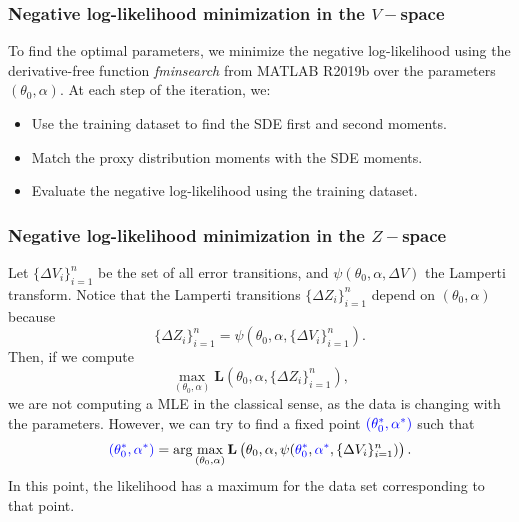 \documentclass[11pt]{article}
\theoremstyle{definition}
\begin{document}
\subsubsection{Negative log-likelihood minimization in the $V-$space} \label{Sec:MinLH}

To find the optimal parameters, we minimize the negative log-likelihood using the derivative-free function \textit{fminsearch} from MATLAB R2019b over the parameters $(\theta_0,\alpha)$. At each step of the iteration,  we:
\begin{itemize}

\item Use the training dataset to find the SDE first and second moments.
\item Match the proxy distribution moments with the SDE moments.
\item Evaluate the negative log-likelihood using the training dataset.

\end{itemize}

\subsubsection{Negative log-likelihood minimization in the $Z-$space} \label{Sec:MinLHL}

Let $\{\Delta V_i\}_{i=1}^n$ be the set of all error transitions, and $\psi(\theta_0,\alpha,\Delta V)$ the Lamperti transform. Notice that the Lamperti transitions $\{\Delta Z_i\}_{i=1}^n$ depend on $(\theta_0,\alpha)$ because $$\{\Delta Z_i\}_{i=1}^n=\psi(\theta_0,\alpha,\{\Delta V_i\}_{i=1}^n).$$
Then, if we compute $$\max_{(\theta_0,\alpha)}\mathbf{L}(\theta_0,\alpha,\{\Delta Z_i\}_{i=1}^n),$$
we are not computing a MLE in the classical sense, as the data is changing with the parameters. However, we can try to find a fixed point ${\color{blue}(\theta_0^*,\alpha^*)}$ such that
\begin{equation}
{\color{blue}(\theta_0^*,\alpha^*)}=\arg\max_{(\theta_0,\alpha)}\mathbf{L}\left(\theta_0,\alpha,\psi({\color{blue}\theta_0^*},{\color{blue}\alpha^*},\{\Delta V_i\}_{i=1}^n)\right).
\label{FP}
\end{equation}
In this point, the likelihood has a maximum for the data set corresponding to that point.
\end{document}
